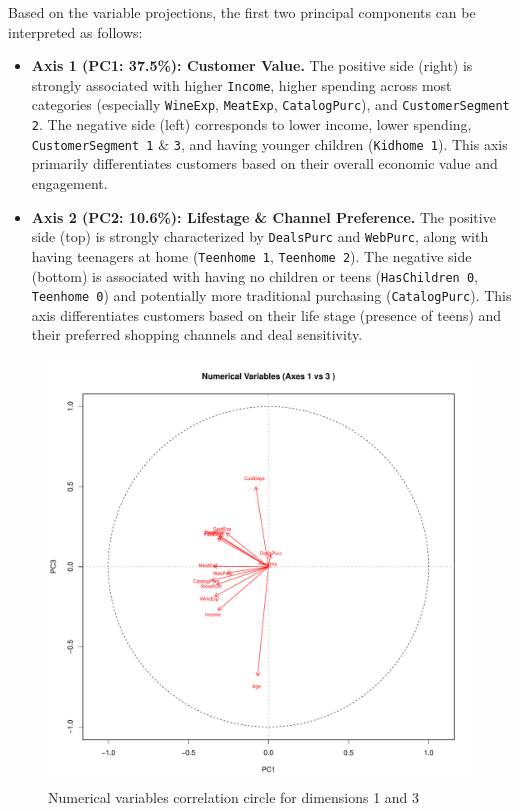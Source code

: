 Based on the variable projections, the first two principal components can be interpreted as follows:

\begin{itemize}
    \item \textbf{Axis 1 (PC1: 37.5\%): Customer Value.} The positive side (right) is strongly associated with higher \texttt{Income}, higher spending across most categories (especially \texttt{WineExp}, \texttt{MeatExp}, \texttt{CatalogPurc}), and \texttt{CustomerSegment 2}. The negative side (left) corresponds to lower income, lower spending, \texttt{CustomerSegment 1} \& \texttt{3}, and having younger children (\texttt{Kidhome 1}). This axis primarily differentiates customers based on their overall economic value and engagement.
    
    \item \textbf{Axis 2 (PC2: 10.6\%): Lifestage \& Channel Preference.} The positive side (top) is strongly characterized by \texttt{DealsPurc} and \texttt{WebPurc}, along with having teenagers at home (\texttt{Teenhome 1}, \texttt{Teenhome 2}). The negative side (bottom) is associated with having no children or teens (\texttt{HasChildren 0}, \texttt{Teenhome 0}) and potentially more traditional purchasing (\texttt{CatalogPurc}). This axis differentiates customers based on their life stage (presence of teens) and their preferred shopping channels and deal sensitivity.
\end{itemize}


\begin{figure}[H]
    \centering
    \includegraphics[width=0.9\linewidth]{Imatges/numerical_variables_map_1_3.pdf}
    \caption{Numerical variables correlation circle for dimensions 1 and 3}
    \label{fig:numerical_map_1_3}
\end{figure}

